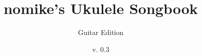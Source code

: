 \documentclass{article}
\newcommand{\titlepicture}[2][]{%
  \renewcommand\placetitlepicture{%
    \texttt{[image: \#2]}\par\medskip
  }%
}
\newcommand{\placetitlepicture}{} %
\begin{document}
\Huge
\title{nomike's Ukulele Songbook}
\author{Guitar Edition}
\date{v. 0.3}
\titlepicture[width=6in]{guitar}

\maketitle
\end{document}
